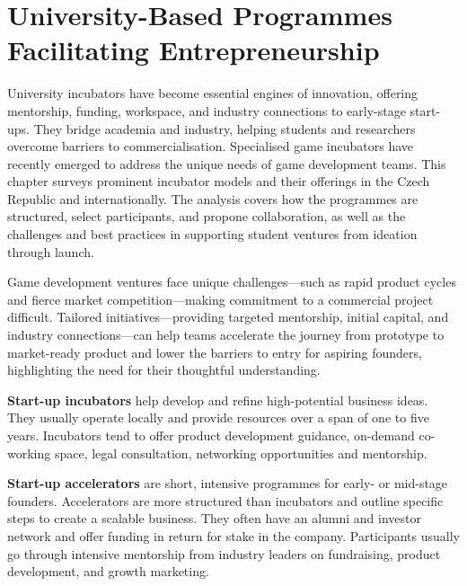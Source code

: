 \chapter{University-Based Programmes Facilitating Entrepreneurship}\label{chap:incubators}

\begin{chapterabstract}
    University incubators have become essential engines of innovation, offering mentorship, funding, workspace, and industry connections to early-stage start-ups. They bridge academia and industry, helping students and researchers overcome barriers to commercialisation. Specialised game incubators have recently emerged to address the unique needs of game development teams. This chapter surveys prominent incubator models and their offerings in the Czech Republic and internationally. The analysis covers how the programmes are structured, select participants, and propone collaboration, as well as the challenges and best practices in supporting student ventures from ideation through launch.
\end{chapterabstract}

Game development ventures face unique challenges---such as rapid product cycles and fierce market competition---making commitment to a commercial project difficult. Tailored initiatives---providing targeted mentorship, initial capital, and industry connections---can help teams accelerate the journey from prototype to market-ready product and lower the barriers to entry for aspiring founders, highlighting the need for their thoughtful understanding.

\textbf{Start-up incubators} help develop and refine high-potential business ideas. They usually operate locally and provide resources over a span of one to five years. Incubators tend to offer product development guidance, on-demand co-working space, legal consultation, networking opportunities and mentorship.
\cite{harward-incub-accelerator}

\textbf{Start-up accelerators} are short, intensive programmes for early- or mid-stage founders. Accelerators are more structured than incubators and outline specific steps to create a scalable business. They often have an alumni and investor network and offer funding in return for stake in the company. Participants usually go through intensive mentorship from industry leaders on fundraising, product development, and growth marketing.
\cite{harward-incub-accelerator}

